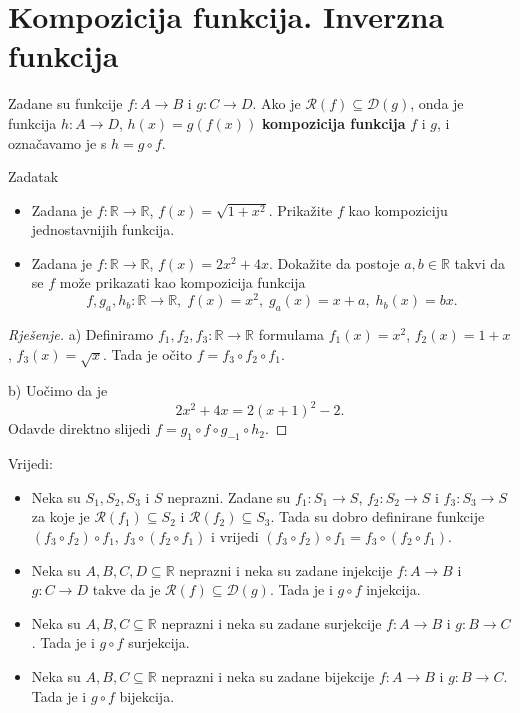 \section{Kompozicija funkcija. Inverzna funkcija}
\begin{definition}
Zadane su funkcije \(f : A\to B\) i \(g : C\to D\). Ako je \(\mathcal{R}(f)\subseteq \mathcal{D}(g)\), onda je funkcija \(h : A\to D\), \(h(x)=g(f(x))\) \textbf{kompozicija funkcija} \(f\) i \(g\), i označavamo je s \(h=g\circ f\).
\end{definition}
\begin{exercise}{Zadatak} \textbf{}
\begin{itemize}
\item[a)] Zadana je \(f : \mathbb{R}\to \mathbb{R}\), \(f(x)=\sqrt{1+x^2}\). Prikažite \(f\) kao kompoziciju jednostavnijih funkcija.
\item[b)] Zadana je \(f : \mathbb{R}\to \mathbb{R}\), \(f(x)=2x^2+4x\). Dokažite da postoje \(a, b\in \mathbb{R}\) takvi da se \(f\) može prikazati kao kompozicija funkcija \[f,g_a,h_b : \mathbb{R}\to \mathbb{R},\;f(x)=x^2,\; g_a(x)=x+a,\; h_b(x)=bx.\]
\end{itemize}
\end{exercise}
\begin{proof}[Rješenje]
a) Definiramo \(f_1, f_2, f_3 : \mathbb{R}\to \mathbb{R}\) formulama \(f_1(x)=x^2\), \(f_2(x)=1+x\), \(f_3(x)=\sqrt{x}\). Tada je očito \(f=f_3\circ f_2\circ f_1\).

b) Uočimo da je
\[2x^2+4x=2(x+1)^2-2.\]
Odavde direktno slijedi \(f=g_1\circ f\circ g_{-1}\circ h_2.\)
\end{proof}
\begin{remark} Vrijedi:
\begin{itemize}
\item Neka su \(S_1, S_2, S_3\) i \(S\) neprazni. Zadane su \(f_1 : S_1 \to S\), \(f_2 : S_2\to S\) i \(f_3 : S_3\to S\) za koje je \(\mathcal{R}(f_1)\subseteq S_2\) i \(\mathcal{R}(f_2)\subseteq S_3\). Tada su dobro definirane funkcije \((f_3\circ f_2)\circ f_1\), \(f_3\circ (f_2\circ f_1)\) i vrijedi \((f_3\circ f_2)\circ f_1=f_3\circ (f_2\circ f_1).\)
\item Neka su \(A, B, C, D\subseteq \mathbb{R}\) neprazni i neka su zadane injekcije \(f : A\to B\) i \(g : C\to D\) takve da je \(\mathcal{R}(f)\subseteq \mathcal{D}(g)\). Tada je i \(g\circ f\) injekcija.
\item Neka su \(A, B, C\subseteq \mathbb{R}\) neprazni i neka su zadane surjekcije \(f : A\to B\) i \(g : B\to C\). Tada je i \(g\circ f\) surjekcija.
\item Neka su \(A, B, C\subseteq \mathbb{R}\) neprazni i neka su zadane bijekcije \(f : A\to B\) i \(g : B\to C\). Tada je i \(g\circ f\) bijekcija.
\end{itemize}
\end{remark}

